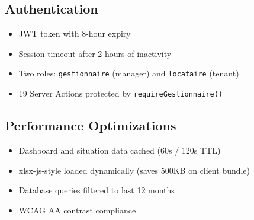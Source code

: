 \documentclass[a4paper,11pt]{article}
\begin{document}
\subsection{Authentication}
\begin{itemize}
  \item JWT token with 8-hour expiry
  \item Session timeout after 2 hours of inactivity
  \item Two roles: \texttt{gestionnaire} (manager) and \texttt{locataire} (tenant)
  \item 19 Server Actions protected by \texttt{requireGestionnaire()}
\end{itemize}

\subsection{Performance Optimizations}
\begin{itemize}
  \item Dashboard and situation data cached (60s / 120s TTL)
  \item xlsx-js-style loaded dynamically (saves 500KB on client bundle)
  \item Database queries filtered to last 12 months
  \item WCAG AA contrast compliance
\end{itemize}
\end{document}
